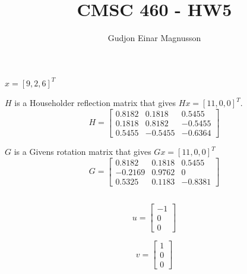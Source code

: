 \documentclass[12pt]{article}
\begin{document}
\title{CMSC 460 - HW5}
\author{Gudjon Einar Magnusson}

\maketitle

\section{}

\subsection{} %
$x = [9, 2, 6]^T$ 

$H$ is a Householder reflection matrix that gives $Hx = [11, 0, 0]^T$.
\[
H =  
\begin{bmatrix}
    0.8182 & 0.1818 & 0.5455 \\
    0.1818 & 0.8182 & -0.5455 \\
    0.5455 & -0.5455 & -0.6364    
\end{bmatrix}
\]

$G$ is a Givens rotation matrix that gives $Gx = [11, 0, 0]^T$
\[
G =  
\begin{bmatrix}
    0.8182 & 0.1818 & 0.5455 \\
   -0.2169 & 0.9762 & 0 \\
    0.5325 & 0.1183 & -0.8381
\end{bmatrix}
\]

\subsection{} %
\[
u =  
\begin{bmatrix}
    -1 \\
    0 \\
    0
\end{bmatrix}
\]

\[
v =  
\begin{bmatrix}
    1 \\
    0 \\
    0
\end{bmatrix}
\]

\section{}
\end{document}
